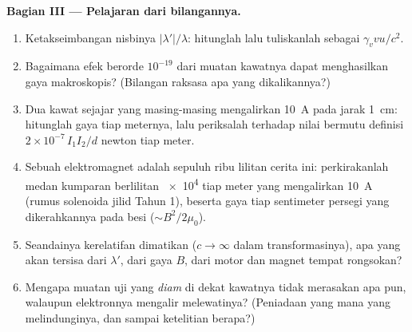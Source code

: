 \begin{problem}
\medskip\noindent\textbf{Bagian III --- Pelajaran dari bilangannya.}
\begin{enumerate}[resume]
  \item Ketakseimbangan nisbinya $|\lambda'|/\lambda$: hitunglah lalu
        tuliskanlah sebagai $\gamma_v vu/c^2$.
  \item Bagaimana efek berorde $10^{-19}$ dari muatan kawatnya dapat
        menghasilkan gaya makroskopis? (Bilangan raksasa apa yang
        dikalikannya?)
  \item Dua kawat sejajar yang masing-masing mengalirkan \qty{10}{A}
        pada jarak \qty{1}{cm}: hitunglah gaya tiap meternya, lalu
        periksalah terhadap nilai bermutu definisi
        $2 \times 10^{-7}\,I_1I_2/d$ newton tiap meter.
  \item Sebuah elektromagnet adalah sepuluh ribu lilitan cerita ini:
        perkirakanlah medan kumparan berlilitan \qty{e4}{} tiap meter
        yang mengalirkan \qty{10}{A} (rumus solenoida jilid Tahun 1),
        beserta gaya tiap sentimeter persegi yang dikerahkannya pada
        besi ($\sim B^2/2\mu_0$).
  \item Seandainya kerelatifan dimatikan ($c \to \infty$ dalam
        transformasinya), apa yang akan tersisa dari $\lambda'$, dari
        gaya $B$, dari motor dan magnet tempat rongsokan?
  \item Mengapa muatan uji yang \emph{diam} di dekat kawatnya tidak
        merasakan apa pun, walaupun elektronnya mengalir melewatinya?
        (Peniadaan yang mana yang melindunginya, dan sampai ketelitian
        berapa?)
\end{enumerate}


\end{problem}
